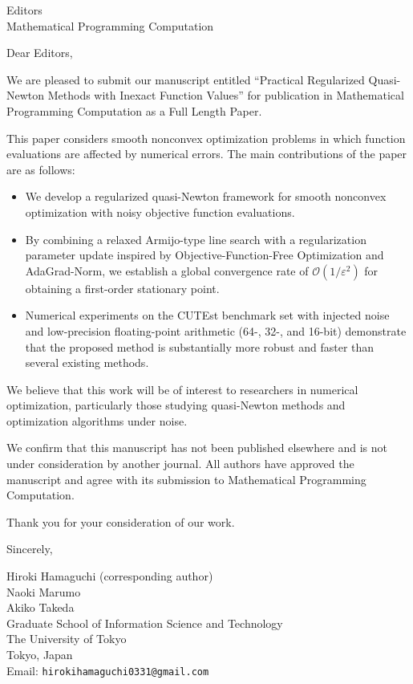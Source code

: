 \documentclass[12pt]{letter}
\begin{document}

\begin{letter}{Editors\\
    Mathematical Programming Computation}

  \opening{Dear Editors,}

  We are pleased to submit our manuscript entitled ``Practical Regularized Quasi-Newton Methods with Inexact Function Values'' for publication in Mathematical Programming Computation as a Full Length Paper.

  This paper considers smooth nonconvex optimization problems in which function evaluations are affected by numerical errors.
  The main contributions of the paper are as follows:
  \begin{itemize}
    \item We develop a regularized quasi-Newton framework for smooth nonconvex optimization with noisy objective function evaluations.
    \item By combining a relaxed Armijo-type line search with a regularization parameter update inspired by Objective-Function-Free Optimization and AdaGrad-Norm, we establish a global convergence rate of $\mathcal{O}(1/\varepsilon^2)$ for obtaining a first-order stationary point.
    \item Numerical experiments on the CUTEst benchmark set with injected noise and low-precision floating-point arithmetic (64-, 32-, and 16-bit) demonstrate that the proposed method is substantially more robust and faster than several existing methods.
  \end{itemize}

  We believe that this work will be of interest to researchers in numerical optimization, particularly those studying quasi-Newton methods and optimization algorithms under noise.

  We confirm that this manuscript has not been published elsewhere and is not under consideration by another journal. All authors have approved the manuscript and agree with its submission to Mathematical Programming Computation.

  Thank you for your consideration of our work.

  \closing{Sincerely,}

  Hiroki Hamaguchi (corresponding author)\\
  Naoki Marumo\\
  Akiko Takeda\\[6pt]

  Graduate School of Information Science and Technology\\
  The University of Tokyo\\
  Tokyo, Japan\\
  Email: \texttt{hirokihamaguchi0331@gmail.com}
\end{letter}
\end{document}
